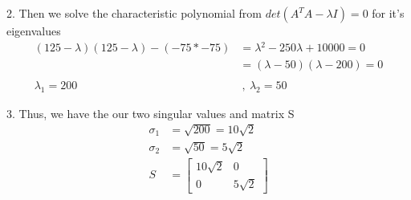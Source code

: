 \documentclass[12pt]{article}
\begin{document}
2. Then we solve the characteristic polynomial from $det(A^TA-\lambda{}I) = 0$ for it's eigenvalues
\begin{align*}
    (125-\lambda{})(125-\lambda{})-(-75*-75) & = \lambda{}^2 - 250\lambda{} + 10000 = 0  \\
                                             & = (\lambda{} - 50)(\lambda{} - 200) = 0   \\ \\
    \lambda_{1} = 200                        & ~,~                     \lambda_{2}  = 50
\end{align*}

3. Thus, we have the our two singular values and matrix S
\begin{align*}
    \sigma_{1} & = \sqrt{200} = 10\sqrt{2}        \\
    \sigma_{2} & = \sqrt{50} = 5\sqrt{2}          \\
    S          & = \begin{bmatrix}
                       10\sqrt{2} & 0 \\ 0 & 5\sqrt{2}
                   \end{bmatrix}
\end{align*}
\end{document}
